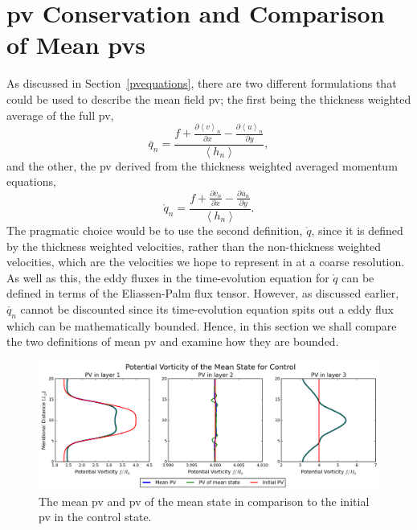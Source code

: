 \documentclass[12pt,a4paper]{report}
\newcommand*\thkmean[1]{\overline{#1}}
\newcommand*\nthkmean[1]{\left\langle{#1}\right\rangle}
\newcommand*\spec[1]{\mathring{#1}}
\newcommand*\secref[1]{Section~\ref{#1}}
\newcommand*{\partialdiff}[2][{}]{\frac{\partial #1}{\partial #2}}
\begin{document}
\section{\gls{pv} Conservation and Comparison of Mean \glspl{pv}}

As discussed in \secref{pvequations}, there are two different formulations that could
be used to describe the mean field \gls{pv}; the first being the thickness weighted average
of the full \gls{pv},
\begin{equation*}
\thkmean{q}_{n} =
\frac{f+\partialdiff[\nthkmean{v}_{n}]{x}-\partialdiff[\nthkmean{u}_{n}]{y}}
{\nthkmean{h_{n}}},
\end{equation*} 
and the other, the \gls{pv} derived from the thickness weighted averaged momentum equations,
\begin{equation*}
\spec{q}_{n} =
\frac{f+\partialdiff[\thkmean{v}_{n}]{x}-\partialdiff[\thkmean{u}_{n}]{y}}
{\nthkmean{h_{n}}}.
\end{equation*} 
The pragmatic choice would be to use the second definition, $\spec{q}$, since it is defined by
the thickness weighted velocities, rather than the non-thickness weighted velocities,
which are the velocities we hope to represent in at a coarse resolution. As well as this,
the eddy fluxes in the time-evolution equation for $\spec{q}$ can be defined in terms of the
Eliassen-Palm flux tensor. However, as discussed earlier, $\thkmean{q}_{n}$ cannot be
 discounted since its time-evolution equation spits out a eddy flux which can be
 mathematically bounded. Hence, in this section we shall compare the two definitions
 of mean \gls{pv} and examine how they are bounded. 
 
 \begin{figure}
 	\centering
 	\includegraphics[width=\linewidth]{meanpv_0}
 	\caption{ The mean \gls{pv} and \gls{pv} of the mean state in
 		comparison to the initial \gls{pv} in the control state. }
 	\label{meanpv0}
 \end{figure}
 
\end{document}
